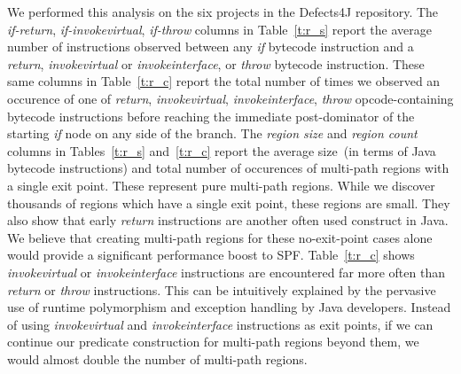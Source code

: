 %
We performed this analysis on the six projects in the Defects4J
repository.
%
The \textit{if-return}, \textit{if-invokevirtual}, \textit{if-throw} columns in Table~\ref{t:r_s} report the average number of instructions observed between any \textit{if} bytecode instruction and a \textit{return}, \textit{invokevirtual} or \textit{invokeinterface}, or \textit{throw} bytecode instruction.
%
These same columns in Table~\ref{t:r_c} report the total number of times we observed an occurence of one of \textit{return}, \textit{invokevirtual}, \textit{invokeinterface}, \textit{throw} opcode-containing bytecode instructions before reaching the immediate post-dominator of the starting \textit{if} node on any side of the branch.
%
The \textit{region size} and \textit{region count} columns in
Tables~\ref{t:r_s} and~\ref{t:r_c} report the average size~(in terms of
Java bytecode instructions) and total number of occurences of multi-path
regions with a single exit point. 
%
These represent pure multi-path regions.
%
While we discover thousands of regions which have a single exit point, these regions are small.
%
They also show that early \textit{return} instructions are another often used construct in Java.
%
We believe that creating multi-path regions for these no-exit-point cases alone would provide a significant performance boost to SPF.
%
Table~\ref{t:r_c} shows \textit{invokevirtual} or \textit{invokeinterface} instructions are encountered far more often than \textit{return} or \textit{throw} instructions.
%
This can be intuitively explained by the pervasive use of runtime polymorphism and exception handling by Java developers.
%
Instead of using \textit{invokevirtual} and \textit{invokeinterface}
instructions as exit points, if we can continue our predicate
construction for multi-path regions beyond them, we would almost double
the number of multi-path regions.


